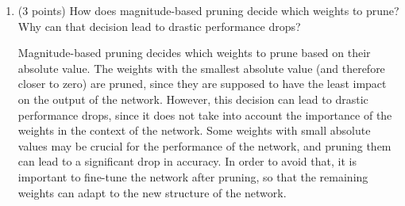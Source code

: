 \documentclass[12pt]{article}
\begin{document}
\begin{ejercicio}[11 points]
\begin{enumerate}[label=\alph*)]
            They are two different techniques to optimize an artificial neural network. However, their aim is totally different.
            \begin{itemize}
                \item Prunning is a technique to reduce the number of parameters (and consequently the number of computations) of an artificial neural network. It is done by removing some of the weights of the network.
                \item Quantization is a technique to reduce the number of bits used to represent the weights of an artificial neural network (and consequently increase the speed of the computations).
            \end{itemize}
            \item (3 points) How does magnitude-based pruning decide which weights to prune? Why can that decision lead to drastic performance drops?
            
            Magnitude-based pruning decides which weights to prune based on their absolute value. The weights with the smallest absolute value (and therefore closer to zero) are pruned, since they are supposed to have the least impact on the output of the network. However, this decision can lead to drastic performance drops, since it does not take into account the importance of the weights in the context of the network. Some weights with small absolute values may be crucial for the performance of the network, and pruning them can lead to a significant drop in accuracy. In order to avoid that, it is important to fine-tune the network after pruning, so that the remaining weights can adapt to the new structure of the network.
        \end{enumerate}
    \end{ejercicio}
\end{document}
